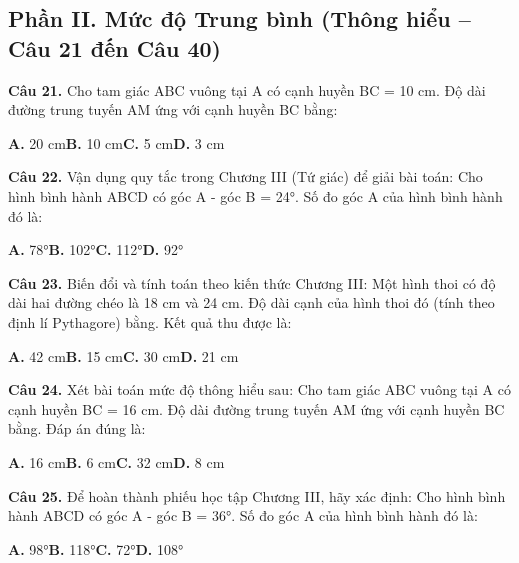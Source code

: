 \documentclass[11pt,a4paper]{article}
\begin{document}
\subsection*{\color{accent} Phần II. Mức độ Trung bình (Thông hiểu -- Câu 21 đến Câu 40)}
\textbf{\color{primary} Câu 21.} Cho tam giác ABC vuông tại A có cạnh huyền BC = 10 cm. Độ dài đường trung tuyến AM ứng với cạnh huyền BC bằng:\par
\hspace*{1.5em}\textbf{A.} 20 cm\quad\quad \textbf{B.} 10 cm\quad\quad \textbf{C.} 5 cm\quad\quad \textbf{D.} 3 cm\par\vspace{2pt}
\textbf{\color{primary} Câu 22.} Vận dụng quy tắc trong Chương III (Tứ giác) để giải bài toán: Cho hình bình hành ABCD có góc A - góc B = 24°. Số đo góc A của hình bình hành đó là:\par
\hspace*{1.5em}\textbf{A.} 78°\quad\quad \textbf{B.} 102°\quad\quad \textbf{C.} 112°\quad\quad \textbf{D.} 92°\par\vspace{2pt}
\textbf{\color{primary} Câu 23.} Biến đổi và tính toán theo kiến thức Chương III: Một hình thoi có độ dài hai đường chéo là 18 cm và 24 cm. Độ dài cạnh của hình thoi đó (tính theo định lí Pythagore) bằng. Kết quả thu được là:\par
\hspace*{1.5em}\textbf{A.} 42 cm\quad\quad \textbf{B.} 15 cm\quad\quad \textbf{C.} 30 cm\quad\quad \textbf{D.} 21 cm\par\vspace{2pt}
\textbf{\color{primary} Câu 24.} Xét bài toán mức độ thông hiểu sau: Cho tam giác ABC vuông tại A có cạnh huyền BC = 16 cm. Độ dài đường trung tuyến AM ứng với cạnh huyền BC bằng. Đáp án đúng là:\par
\hspace*{1.5em}\textbf{A.} 16 cm\quad\quad \textbf{B.} 6 cm\quad\quad \textbf{C.} 32 cm\quad\quad \textbf{D.} 8 cm\par\vspace{2pt}
\textbf{\color{primary} Câu 25.} Để hoàn thành phiếu học tập Chương III, hãy xác định: Cho hình bình hành ABCD có góc A - góc B = 36°. Số đo góc A của hình bình hành đó là:\par
\hspace*{1.5em}\textbf{A.} 98°\quad\quad \textbf{B.} 118°\quad\quad \textbf{C.} 72°\quad\quad \textbf{D.} 108°\par\vspace{2pt}
\end{document}
